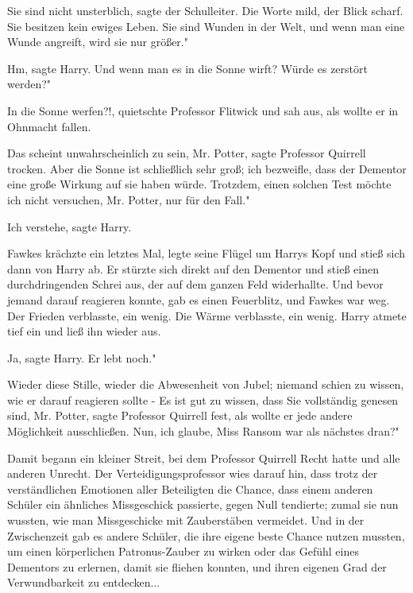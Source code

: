 \glqq Sie sind nicht unsterblich\grqq{}, sagte der Schulleiter. Die Worte mild,
der Blick scharf. \glqq Sie besitzen kein ewiges Leben. Sie sind Wunden in der
Welt, und wenn man eine Wunde angreift, wird sie nur größer."

\glqq Hm\grqq{}, sagte Harry. \glqq Und wenn man es in die Sonne wirft? Würde es
zerstört werden?"

\glqq In die Sonne werfen?!\grqq{}, quietschte Professor Flitwick und sah aus,
als wollte er in Ohnmacht fallen.

\glqq Das scheint unwahrscheinlich zu sein, Mr. Potter\grqq{}, sagte Professor
Quirrell trocken. \glqq Aber die Sonne ist schließlich sehr groß; ich bezweifle,
dass der Dementor eine große Wirkung auf sie haben würde. Trotzdem, einen
solchen Test möchte ich nicht versuchen, Mr. Potter, nur für den Fall."

\glqq Ich verstehe\grqq{}, sagte Harry.

Fawkes krächzte ein letztes Mal, legte seine Flügel um Harrys Kopf und stieß
sich dann von Harry ab. Er stürzte sich direkt auf den Dementor und stieß einen
durchdringenden Schrei aus, der auf dem ganzen Feld widerhallte. Und bevor
jemand darauf reagieren konnte, gab es einen Feuerblitz, und Fawkes war weg. Der
Frieden verblasste, ein wenig. Die Wärme verblasste, ein wenig. Harry atmete
tief ein und ließ ihn wieder aus.

\glqq Ja\grqq{}, sagte Harry. \glqq Er lebt noch."

Wieder diese Stille, wieder die Abwesenheit von Jubel; niemand schien zu wissen,
wie er darauf reagieren sollte - \glqq Es ist gut zu wissen, dass Sie
vollständig genesen sind, Mr. Potter\grqq{}, sagte Professor Quirrell fest, als
wollte er jede andere Möglichkeit ausschließen. \glqq Nun, ich glaube, Miss
Ransom war als nächstes dran?"

Damit begann ein kleiner Streit, bei dem Professor Quirrell Recht hatte und alle
anderen Unrecht. Der Verteidigungsprofessor wies darauf hin, dass trotz der
verständlichen Emotionen aller Beteiligten die Chance, dass einem anderen
Schüler ein ähnliches Missgeschick passierte, gegen Null tendierte; zumal sie
nun wussten, wie man Missgeschicke mit Zauberstäben vermeidet. Und in der
Zwischenzeit gab es andere Schüler, die ihre eigene beste Chance nutzen mussten,
um einen körperlichen Patronus-Zauber zu wirken oder das Gefühl eines Dementors
zu erlernen, damit sie fliehen konnten, und ihren eigenen Grad der
Verwundbarkeit zu entdecken...

